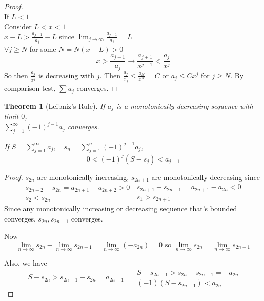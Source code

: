 \documentclass[twoside]{amsart}
\theoremstyle{plain}
\newtheorem{theorem}{Theorem}
\theoremstyle{definition}
\begin{document}
\begin{proof} \quad \\
  If $L<1$ \medskip \\
  \phantom{ If } Consider $L< x < 1$ \bigskip \\
  $x - L > \frac{ a_{j+1} }{ a_j } - L $ since $\lim_{j\to \infty} \frac{ a_{j+1}}{ a_j } = L$ \medskip \\
  \phantom{ If } $\forall j \geq N $ for some $N = N(x-L) > 0$  
\[
x > \frac{ a_{j+1}}{ a_j } \to \frac{ a_{j+1}}{ x^{j+1} } < \frac{ a_j}{x^j }
\]
So then $\frac{a_j}{x^j }$ is decreasing with $j$.  Then $\frac{a_j}{x_j} \leq \frac{a_N}{x^N} = C$ or $a_j \leq C x^j$ for $j\geq N$.  By comparison test, $\sum a_j$ converges.  
\end{proof}

\begin{theorem}[Leibniz's Rule] If $a_j$ is a monotonically decreasing sequence with limit $0$, \medskip \\
\quad  $\sum_{j=1}^{\infty} (-1)^{j-1} a_j$ converges.  

If $S = \sum_{j=1}^{\infty} a_j, \quad s_n = \sum_{j=1}^n (-1)^{j-1} a_j$, 
\[
0 < (-1)^j (S-s_j) < a_{j+1}
\]
\end{theorem}

\begin{proof}
  $s_{2n}$ are monotonically increasing, $s_{2n+1}$ are monotonically decreasing since 
\[
\begin{gathered}
  s_{2n+2} - s_{2n} = a_{2n+1} - a_{2n+2} > 0 \\
  s_2 < s_{2n}
\end{gathered}
\, \begin{gathered}
  s_{2n+1} - s_{2n-1} = a_{2n+1} - a_{2n} < 0 \\
  s_1 > s_{2n+1}
\end{gathered}
\]
Since any monotonically increasing or decreasing sequence that's bounded converges, $s_{2n}, s_{2n+1}$ converges.  

Now
\[
\lim_{n\to \infty} s_{2n} - \lim_{n\to \infty} s_{2n+1} = \lim_{n\to \infty} (-a_{2n}) = 0 \text{ so } \lim_{n\to \infty} s_{2n}  = \lim_{n \to \infty} s_{2n-1}
\]

Also, we have
\[
\begin{gathered}
  S - s_{2n} > s_{2n+1} - s_{2n}  = a_{2n+1} 
\end{gathered}\quad
\begin{gathered}
  S-s_{2n-1} > s_{2n} - s_{2n-1} = -a_{2n} \\
  (-1)(S - s_{2n-1} ) < a_{2n}
\end{gathered}
\]

\end{proof}
\end{document}
